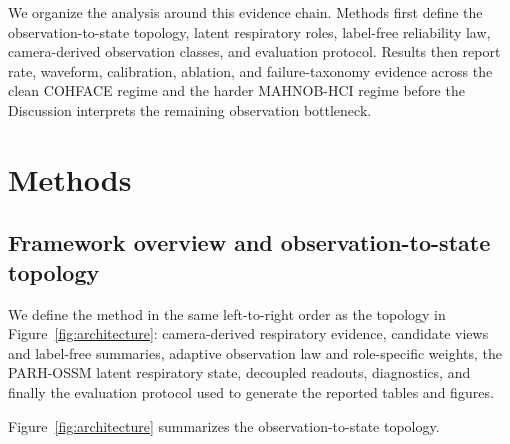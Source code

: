 \documentclass[fleqn,10pt]{wlscirep}
\begin{document}
We organize the analysis around this evidence chain. Methods first define the
observation-to-state topology, latent respiratory roles, label-free reliability
law, camera-derived observation classes, and evaluation protocol. Results then
report rate, waveform, calibration, ablation, and failure-taxonomy evidence
across the clean COHFACE regime and the harder MAHNOB-HCI regime before the
Discussion interprets the remaining observation bottleneck.

\section*{Methods}
\subsection*{Framework overview and observation-to-state topology}
We define the method in the same left-to-right order as the topology in
Figure~\ref{fig:architecture}: camera-derived respiratory evidence,
candidate views and label-free summaries, adaptive observation law and
role-specific weights, the PARH-OSSM latent respiratory state, decoupled
readouts, diagnostics, and finally the evaluation protocol used to generate
the reported tables and figures.

Figure~\ref{fig:architecture} summarizes the observation-to-state topology.
\end{document}
